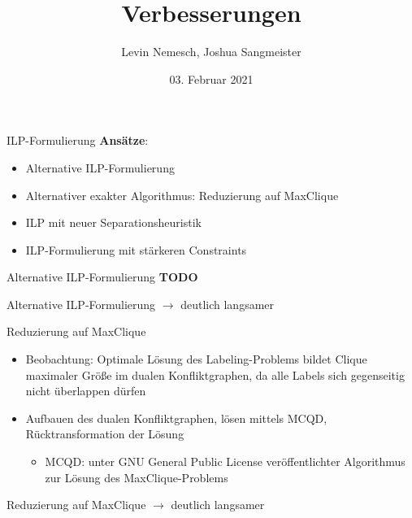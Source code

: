 \documentclass[ngerman,aspectratio=169,10pt]{beamer}
\title{Verbesserungen}
\date{03. Februar 2021}
\author{Levin Nemesch, Joshua Sangmeister}
\institute{Algorithm Engineering - Projekt}
\begin{document}
\maketitle

\begin{frame}{ILP-Formulierung}
	\textbf{Ansätze}:
    \begin{itemize}
        \item Alternative ILP-Formulierung
        \item Alternativer exakter Algorithmus: Reduzierung auf MaxClique
        \item ILP mit neuer Separationsheuristik
        \item ILP-Formulierung mit stärkeren Constraints
    \end{itemize}
\end{frame}

\begin{frame}{Alternative ILP-Formulierung}
	\textbf{TODO}
\end{frame}

\begin{frame}{Alternative ILP-Formulierung}
    \centering
    $\longrightarrow$ deutlich langsamer
\end{frame}

\begin{frame}{Reduzierung auf MaxClique}
    \begin{itemize}
        \item Beobachtung: Optimale Lösung des Labeling-Problems bildet Clique maximaler Größe im dualen Konfliktgraphen, da alle Labels sich gegenseitig nicht überlappen dürfen
        \pause
        \item Aufbauen des dualen Konfliktgraphen, lösen mittels MCQD, Rücktransformation der Lösung
        \begin{itemize}
            \item MCQD: unter GNU General Public License veröffentlichter Algorithmus zur Lösung des MaxClique-Problems
       \end{itemize}
    \end{itemize}
    \pause
\end{frame}

\begin{frame}{Reduzierung auf MaxClique}
    \centering
    $\longrightarrow$ deutlich langsamer
\end{frame}
\end{document}
